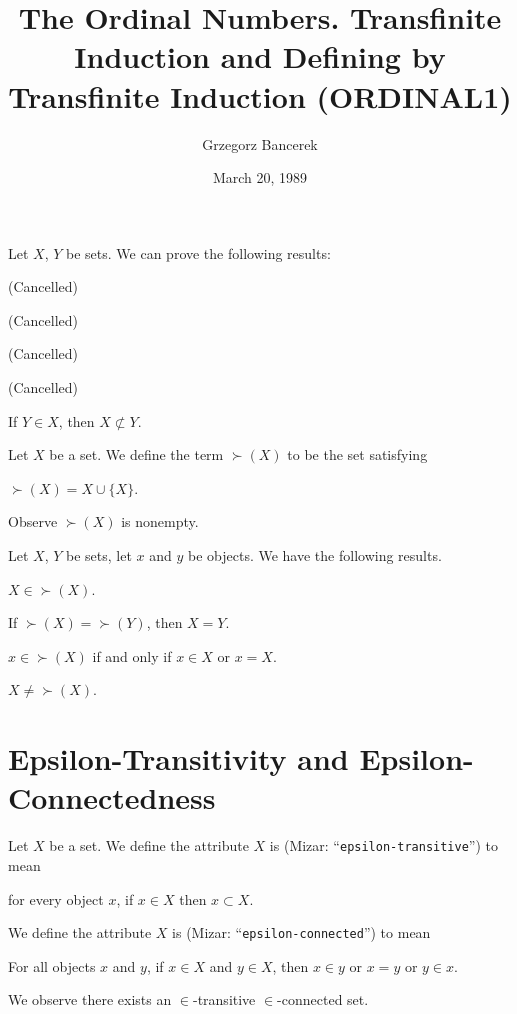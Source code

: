 \documentclass{article}
\title[The Ordinal Numbers (ORDINAL1)]{The Ordinal Numbers. Transfinite Induction and Defining by Transfinite Induction (ORDINAL1)}
\author{Grzegorz Bancerek}
\date{March 20, 1989}
\begin{document}
\maketitle

Let $X$, $Y$ be sets. We can prove the following results:
\begin{thm}
\item\label{ordinal1:1} (Cancelled)
\item\label{ordinal1:2} (Cancelled)
\item\label{ordinal1:3} (Cancelled)
\item\label{ordinal1:4} (Cancelled)
\item\label{ordinal1:5} If $Y\in X$, then $X\nsubset Y$.
\end{thm}

\begin{definition}
Let $X$ be a set. We define the term $\succ(X)$ to be the set satisfying
\begin{defn}
\item $\succ(X)=X\cup\{X\}$.
\end{defn}
\end{definition}

Observe $\succ(X)$ is nonempty.

Let $X$, $Y$ be sets, let $x$ and $y$ be objects.
We have the following results.
\begin{thm}
\item\label{ordinal1:6} $X\in\succ(X)$.
\item\label{ordinal1:7} If $\succ(X)=\succ(Y)$, then $X=Y$.
\item\label{ordinal1:8} $x\in\succ(X)$ if and only if $x\in X$ or $x=X$.
\item\label{ordinal1:9} $X\neq\succ(X)$.
\end{thm}

\section*{Epsilon-Transitivity and Epsilon-Connectedness}

\begin{definition}
Let $X$ be a set.
We define the attribute $X$ is  (Mizar: ``\verb#epsilon-transitive#'')
to mean
\begin{defn}
\item for every object $x$, if $x\in X$ then $x\subset X$.
\end{defn}
We define the attribute $X$ is  (Mizar: ``\verb#epsilon-connected#'')
to mean
\begin{defn}
\item For all objects $x$ and $y$, if $x\in X$ and $y\in X$, then $x\in y$
  or $x=y$ or $y\in x$.
\end{defn}
\end{definition}
We observe there exists an $\in$-transitive $\in$-connected set.
\end{document}

